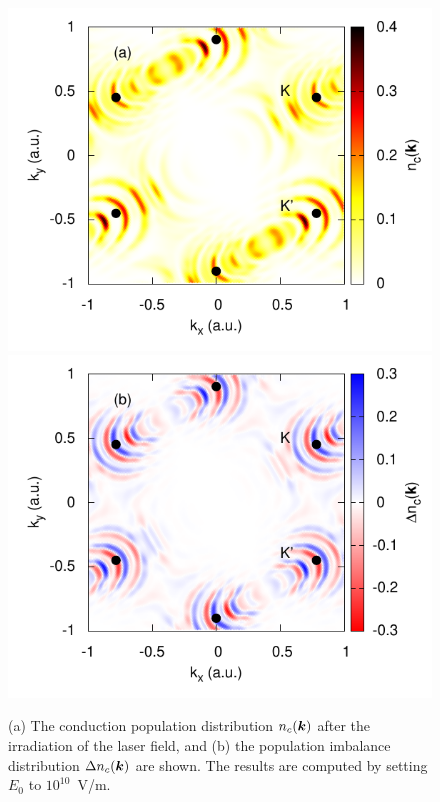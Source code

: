 \begin{figure}[htb]
\centering
\includegraphics[width=0.8\linewidth]{pic/nex_pop_E0_1e10.pdf}
\includegraphics[width=0.8\linewidth]{pic/dnex_pop_E0_1e10.pdf}
\caption{\label{fig:nex_pop_E0_1e10} 
(a) The conduction population distribution $n_{c}(\boldsymbol k)$ after the irradiation of the laser field, and (b) the population imbalance distribution $\Delta n_c (\boldsymbol k)$ are shown. The results are computed by setting $E_0$ to $10^{10}$~V/m.
}
\end{figure}

